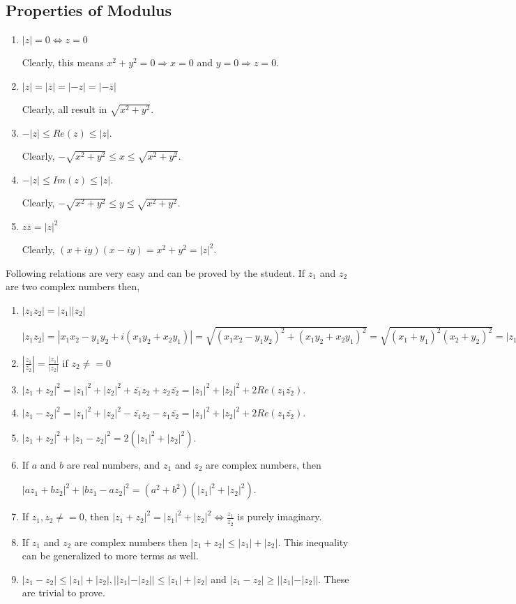 \subsection{Properties of Modulus}
\begin{enumerate}
\item $|z| = 0 \Leftrightarrow z = 0$

  Clearly, this means $x^2 + y^2 = 0 \Rightarrow x = 0$ and $y = 0 \Rightarrow z = 0$.
\item $|z| = |\overline{z}| = |-z| = |-\overline{z}|$

  Clearly, all result in $\sqrt{x^2 + y^2}$.
\item $-|z| \leq Re(z) \leq |z|$.

  Clearly, $-\sqrt{x^2 + y^2}\leq x\leq \sqrt{x^2 + y^2}$.
\item $-|z| \leq Im(z) \leq |z|$.

  Clearly, $-\sqrt{x^2 + y^2}\leq y\leq \sqrt{x^2 + y^2}$.
\item $z\overline{z} = |z|^2$

  Clearly, $(x + iy)(x - iy) = x^2 + y^2 = |z|^2.$
\end{enumerate}

\noindent Following relations are very easy and can be proved by the student. If $z_1$ and $z_2$ are two complex numbers then,

\begin{enumerate}[resume]
\item $|z_1z_2| = |z_1||z_2|$

  $|z_1z_2| = |x_1x_2 - y_1y_2 + i(x_1y_2 + x_2y_1)| = \sqrt{(x_1x_2 - y_1y_2)^2 + (x_1y_2 + x_2y_1)^2} = \sqrt{(x_1 + y_1)^2(x_2 +
  y_2)^2} = |z_1||z_2|$
\item $\left|\frac{z_1}{z_2}\right| = \frac{|z_1|}{|z_2|}$ if $z_2\neq = 0$
\item $|z_1 + z_2|^2 = |z_1|^2 + |z_2|^2 + \overline{z_1}z_2 + z_2\overline{z_2} = |z_1|^2 + |z_2|^2 + 2Re(z_1\overline{z_2})$.
\item $|z_1 - z_2|^2 = |z_1|^2 + |z_2|^2 - \overline{z_1}z_2 - z_1\overline{z_2} = |z_1|^2 + |z_2|^2 + 2Re(z_1\overline{z_2})$.
\item $|z_1 + z_2|^2 + |z_1 - z_2|^2 = 2\left(|z_1|^2 + |z_2|^2\right)$.
\item If $a$ and $b$ are real numbers, and $z_1$ and $z_2$ are complex numbers, then

  $|az_1 + bz_2|^2 + |bz_1 - az_2|^2 = (a^2 + b^2)\left(|z_1|^2 + |z_2|^2\right)$.
\item If $z_1, z_2\neq = 0$, then $|z_1 + z_2|^2 = |z_1|^2 + |z_2|^2 \Leftrightarrow \frac{z_1}{z_2}$ is purely imaginary.
\item If $z_1$ and $z_2$ are complex numbers then $|z_1 + z_2| \leq |z_1| + |z_2|$. This inequality can be generalized to more
  terms as well.
\item $|z_1 - z_2| \leq |z_1| + |z_2|, ||z_1| - |z_2||\leq |z_1| + |z_2|$ and $|z_1 - z_2|\geq ||z_1| - |z_2||$. These are trivial
  to prove.
\end{enumerate}

